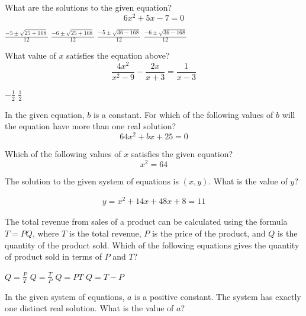 \question[1]
What are the solutions to the given equation?
\[
6 x^{2}+5 x-7=0
\]
\begin{choices}
  \CorrectChoice $\frac{-5 \pm \sqrt{25+168}}{12}$
  \choice $\frac{-6 \pm \sqrt{25+168}}{12}$
  \choice $\frac{-5 \pm \sqrt{36-168}}{12}$
  \choice $\frac{-6 \pm \sqrt{36-168}}{12}$
\end{choices}

\question[1]
What value of $x$ satisfies the equation above?
\[
\frac{4 x^{2}}{x^{2}-9}-\frac{2 x}{x+3}=\frac{1}{x-3}
\]
\begin{choices}
  \choice $-\frac{1}{2}$
  \CorrectChoice $\frac{1}{2}$
\end{choices}

\question[1]
In the given equation, $b$ is a constant. For which of the following values of $b$ will the equation have more than one real solution?
\[
64 x^{2}+b x+25=0
\]
\begin{choices}
\end{choices}

\question[1]
Which of the following values of $x$ satisfies the given equation?
\[
x^{2}=64
\]
\begin{choices}
\end{choices}

\question[1]
The solution to the given system of equations is $(x, y)$. What is the value of $y$?

\[
\begin{gathered}
y=x^{2}+14 x+48 
x+8=11
\end{gathered}
\]

\begin{solutionorbox}[1in]
\end{solutionorbox}

\question[1]
The total revenue from sales of a product can be calculated using the formula $T=PQ$, where $T$ is the total revenue, $P$ is the price of the product, and $Q$ is the quantity of the product sold. Which of the following equations gives the quantity of product sold in terms of $P$ and $T$?
\begin{choices}
  \choice $Q=\frac{P}{T}$
  \CorrectChoice $Q=\frac{T}{P}$
  \choice $Q=P T$
  \choice $Q=T-P$
\end{choices}

\question[1]
In the given system of equations, $a$ is a positive constant. The system has exactly one distinct real solution. What is the value of $a$?

